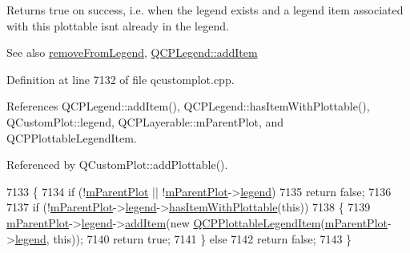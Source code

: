 Returns true on success, i.\+e. when the legend exists and a legend item associated with this plottable isn\textquotesingle{}t already in the legend.

\begin{DoxySeeAlso}{See also}
\hyperlink{class_q_c_p_abstract_plottable_aa1f350e510326d012b9a9c9249736c83}{remove\+From\+Legend}, \hyperlink{class_q_c_p_legend_a3ab274de52d2951faea45a6d975e6b3f}{Q\+C\+P\+Legend\+::add\+Item} 
\end{DoxySeeAlso}


Definition at line 7132 of file qcustomplot.\+cpp.



References Q\+C\+P\+Legend\+::add\+Item(), Q\+C\+P\+Legend\+::has\+Item\+With\+Plottable(), Q\+Custom\+Plot\+::legend, Q\+C\+P\+Layerable\+::m\+Parent\+Plot, and Q\+C\+P\+Plottable\+Legend\+Item.



Referenced by Q\+Custom\+Plot\+::add\+Plottable().


\begin{DoxyCode}
7133 \{
7134   \textcolor{keywordflow}{if} (!\hyperlink{class_q_c_p_layerable_aa2a528433e44db02b8aef23c1f9f90ed}{mParentPlot} || !\hyperlink{class_q_c_p_layerable_aa2a528433e44db02b8aef23c1f9f90ed}{mParentPlot}->\hyperlink{class_q_custom_plot_a4eadcd237dc6a09938b68b16877fa6af}{legend})
7135     \textcolor{keywordflow}{return} \textcolor{keyword}{false};
7136   
7137   \textcolor{keywordflow}{if} (!\hyperlink{class_q_c_p_layerable_aa2a528433e44db02b8aef23c1f9f90ed}{mParentPlot}->\hyperlink{class_q_custom_plot_a4eadcd237dc6a09938b68b16877fa6af}{legend}->\hyperlink{class_q_c_p_legend_a2eb1d24bdf5658e64962a656303fd61a}{hasItemWithPlottable}(\textcolor{keyword}{this}))
7138   \{
7139     \hyperlink{class_q_c_p_layerable_aa2a528433e44db02b8aef23c1f9f90ed}{mParentPlot}->\hyperlink{class_q_custom_plot_a4eadcd237dc6a09938b68b16877fa6af}{legend}->\hyperlink{class_q_c_p_legend_a3ab274de52d2951faea45a6d975e6b3f}{addItem}(\textcolor{keyword}{new} 
      \hyperlink{class_q_c_p_abstract_plottable_a104c78e91302afd6842a903e472f552f}{QCPPlottableLegendItem}(\hyperlink{class_q_c_p_layerable_aa2a528433e44db02b8aef23c1f9f90ed}{mParentPlot}->\hyperlink{class_q_custom_plot_a4eadcd237dc6a09938b68b16877fa6af}{legend}, \textcolor{keyword}{this}));
7140     \textcolor{keywordflow}{return} \textcolor{keyword}{true};
7141   \} \textcolor{keywordflow}{else}
7142     \textcolor{keywordflow}{return} \textcolor{keyword}{false};
7143 \}
\end{DoxyCode}


